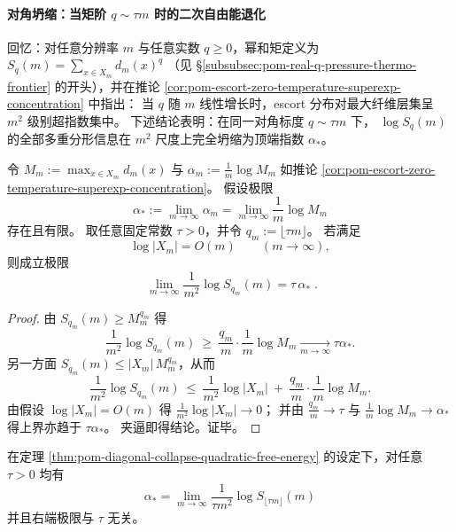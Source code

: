 
\paragraph{对角坍缩：当矩阶 \(q\sim \tau m\) 时的二次自由能退化}
回忆：对任意分辨率 \(m\) 与任意实数 \(q\ge 0\)，幂和矩定义为
\(
S_q(m)=\sum_{x\in X_m} d_m(x)^q
\)
（见 \S\ref{subsubsec:pom-real-q-pressure-thermo-frontier} 的开头），并在推论 \ref{cor:pom-escort-zero-temperature-superexp-concentration} 中指出：
当 \(q\) 随 \(m\) 线性增长时，escort 分布对最大纤维层集呈 \(m^2\) 级别超指数集中。
下述结论表明：在同一对角标度 \(q\sim \tau m\) 下，
\(\log S_q(m)\) 的全部多重分形信息在 \(m^2\) 尺度上完全坍缩为顶端指数 \(\alpha_\ast\)。

\begin{theorem}[对角坍缩二次自由能律]\label{thm:pom-diagonal-collapse-quadratic-free-energy}
令
\(
M_m:=\max_{x\in X_m}d_m(x)
\)
与
\(
\alpha_m:=\frac{1}{m}\log M_m
\)
如推论 \ref{cor:pom-escort-zero-temperature-superexp-concentration}。
假设极限
\[
\alpha_\ast:=\lim_{m\to\infty}\alpha_m=\lim_{m\to\infty}\frac{1}{m}\log M_m
\]
存在且有限。
取任意固定常数 \(\tau>0\)，并令 \(q_m:=\lfloor\tau m\rfloor\)。
若满足
\[
\log|X_m|=O(m)\qquad(m\to\infty),
\]
则成立极限
\[
\boxed{\;
\lim_{m\to\infty}\frac{1}{m^2}\log S_{q_m}(m)=\tau\,\alpha_\ast\; }.
\]
\end{theorem}
\begin{proof}
由 \(S_{q_m}(m)\ge M_m^{q_m}\) 得
\[
\frac{1}{m^2}\log S_{q_m}(m)\ \ge\ \frac{q_m}{m}\cdot \frac{1}{m}\log M_m
\xrightarrow[m\to\infty]{}\tau\alpha_\ast.
\]
另一方面 \(S_{q_m}(m)\le |X_m|\,M_m^{q_m}\)，从而
\[
\frac{1}{m^2}\log S_{q_m}(m)
\ \le\
\frac{1}{m^2}\log|X_m|
\ +\
\frac{q_m}{m}\cdot\frac{1}{m}\log M_m.
\]
由假设 \(\log|X_m|=O(m)\) 得 \(\frac{1}{m^2}\log|X_m|\to 0\)；
并由 \(\frac{q_m}{m}\to\tau\) 与 \(\frac{1}{m}\log M_m\to\alpha_\ast\) 得上界亦趋于 \(\tau\alpha_\ast\)。
夹逼即得结论。证毕。
\end{proof}

\begin{corollary}[对角提取原理：由单一对角确定 \texorpdfstring{$\alpha_\ast$}{alpha*}]\label{cor:pom-diagonal-extract-alpha-star}
在定理 \ref{thm:pom-diagonal-collapse-quadratic-free-energy} 的设定下，对任意 \(\tau>0\) 均有
\[
\boxed{\;
\alpha_\ast=\lim_{m\to\infty}\frac{1}{\tau m^2}\log S_{\lfloor\tau m\rfloor}(m)\;}
\]
并且右端极限与 \(\tau\) 无关。
\end{corollary}

